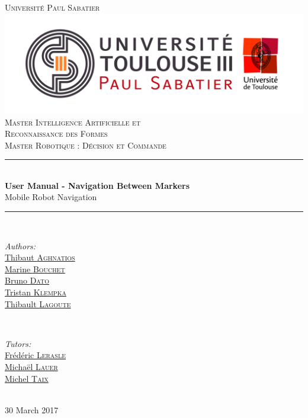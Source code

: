 \documentclass[10pt,a4paper]{article}
\begin{document}
\pagestyle {plain}

\begin{titlepage}


\newcommand{\HRule}{\rule{\linewidth}{0.5mm}} 

\center

\textsc{\Large Université Paul Sabatier}\\[1cm] 
\includegraphics[scale=0.3]{UPS.jpg}\\[0.6cm] 


\textsc{Master Intelligence Artificielle et \\ 
Reconnaissance des Formes \\ Master Robotique : Décision et Commande}\\[3cm] 

\HRule \\[0.4cm]
{ \huge \bfseries User Manual - Navigation Between Markers}\\[0.4cm] 
\LARGE Mobile Robot Navigation

\HRule \\[1.5cm]
 

\begin{minipage}{0.4\textwidth}
\begin{flushleft} \large
\emph{Authors:}\\
\href{mailto:thibaut.aghnatios@laposte.net}{Thibaut \textsc{Aghnatios} }  \\
\href{mailto:bouchetmarinee@gmail.com}{Marine \textsc{Bouchet} } \\
\href{mailto:bruno.dato.meneses@gmail.com}{Bruno \textsc{Dato} } \\
\href{mailto:klempka.tristan@gmail.com}{Tristan \textsc{Klempka} } \\
\href{mailto:lagoute.31@gmail.com}{Thibault \textsc{Lagoute} }  
\end{flushleft}
\end{minipage}
~
\begin{minipage}{0.4\textwidth}
\begin{flushright} \large
\emph{Tutors:} \\
\href{mailto:lerasle@laas.fr}{Frédéric \textsc{Lerasle}}\\
\href{mailto:michael.lauer@laas.fr}{Michaël \textsc{Lauer}} \\
\href{mailto:taix@laas.f}{Michel \textsc{Taix}}
\end{flushright}
\end{minipage}\\[5cm]


\large 30 March 2017
 

\end{titlepage}
\end{document}
